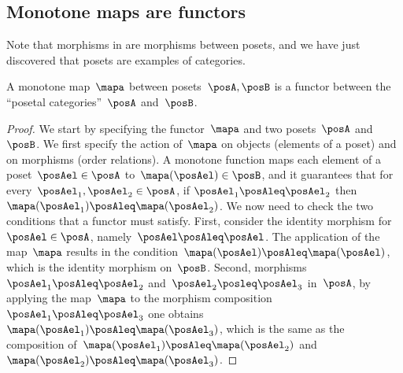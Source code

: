 \subsection{Monotone maps are functors}
Note that morphisms in \Pos are morphisms between posets, and we have just discovered that posets are examples of categories.
\begin{lemma}
  \label{lem:posetfunctor}
  A monotone map~$\mapa$ between posets~$\posA,\posB$ is a functor between the ``posetal categories''~$\posA$ and~$\posB$.
\end{lemma}
\begin{proof}
  We start by specifying the functor~$\mapa$ and two posets~$\posA$ and~$\posB$. We first specify the action of~$\mapa$ on objects (elements of a poset) and on morphisms (order relations). A monotone function maps each element of a poset~$\posAel\in \posA$ to~$\mapa(\posAel) \in \posB$, and it guarantees that for every~$\posAel_1,\posAel_2\in \posA$, if $\posAel_1\posAleq \posAel_2$ then~$\mapa(\posAel_1)\posAleq \mapa(\posAel_2)$. We now need to check the two conditions that a functor must satisfy. First, consider the identity morphism for~$\posAel\in \posA$, namely~$\posAel \posAleq \posAel$. The application of the map~$\mapa$ results in the condition~$\mapa(\posAel)\posAleq \mapa(\posAel)$, which is the identity morphism on~$\posB$. Second, morphisms~$\posAel_1\posAleq \posAel_2$ and~$\posAel_2\posleq \posAel_3$ in~$\posA$, by applying the map~$\mapa$ to the morphism composition~$\posAel_1\posAleq \posAel_3$ one obtains~$\mapa(\posAel_1)\posAleq \mapa(\posAel_3)$, which is the same as the composition of~$\mapa(\posAel_1)\posAleq \mapa(\posAel_2)$ and~$\mapa(\posAel_2)\posAleq \mapa(\posAel_3)$.
\end{proof}

